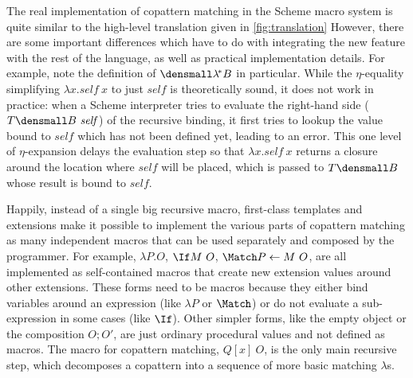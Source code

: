 The real implementation of copattern matching in the Scheme macro system is quite similar to the high-level translation given in \cref{fig:translation}
However, there are some important differences which have to do with integrating the new feature with the rest of the language, as well as practical implementation details.
For example, note the definition of $\den{\lamstar B}$ in particular.
While the $\eta$-equality simplifying $\lambda x. \mathit{self} ~ x$ to just $\mathit{self}$ is theoretically sound, it does not work in practice:
when a Scheme interpreter tries to evaluate the right-hand side ($T\den{B}~\mathit{self}$) of the recursive binding, it first tries to lookup the value bound to $\mathit{self}$ which has not been defined yet, leading to an error.
This one level of $\eta$-expansion delays the evaluation step so that $\lambda x. \mathit{self} ~ x$ returns a closure around the location where $\mathit{self}$ will be placed, which is passed to $T\den{B}$ whose result is bound to $\mathit{self}$.

Happily, instead of a single big recursive macro, first-class templates and extensions make it possible to implement the various parts of copattern matching as many independent macros that can be used separately and composed by the programmer. 
For example, $\lambda P. O$, $\If M ~ O$, $\Match P \gets M ~ O$, \etc are all implemented as self-contained macros that create new extension values around other extensions.
These forms need to be macros because they either bind variables around an expression (like $\lambda P$ or $\Match$) or do not evaluate a sub-expression in some cases (like $\If$).
Other simpler forms, like the empty object or the composition $O; O'$, are just ordinary procedural values and not defined as macros.
The macro for copattern matching, $Q[x]~O$, is the only main recursive step, which decomposes a copattern into a sequence of more basic matching $\lambda$s.

